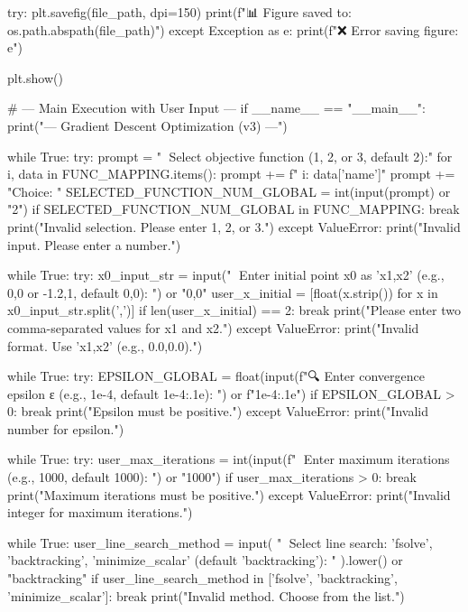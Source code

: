 \documentclass[12pt]{article} %
\begin{document}
\begin{python}
    try:
        plt.savefig(file_path, dpi=150)
        print(f"📊 Figure saved to: {os.path.abspath(file_path)}")
    except Exception as e:
        print(f"❌ Error saving figure: {e}")
    
    plt.show()

# --- Main Execution with User Input ---
if __name__ == "__main__":
    print("--- Gradient Descent Optimization (v3) ---")
    
    while True:
        try:
            prompt = "🎯 Select objective function (1, 2, or 3, default 2):\n"
            for i, data in FUNC_MAPPING.items():
                prompt += f"   {i}: {data['name']}\n"
            prompt += "Choice: "
            SELECTED_FUNCTION_NUM_GLOBAL = int(input(prompt) or "2")
            if SELECTED_FUNCTION_NUM_GLOBAL in FUNC_MAPPING:
                break
            print("Invalid selection. Please enter 1, 2, or 3.")
        except ValueError: print("Invalid input. Please enter a number.")

    while True:
        try:
            x0_input_str = input("📍 Enter initial point x0 as 'x1,x2' (e.g., 0,0 or -1.2,1, default 0,0): ") or "0,0"
            user_x_initial = [float(x.strip()) for x in x0_input_str.split(',')]
            if len(user_x_initial) == 2: break
            print("Please enter two comma-separated values for x1 and x2.")
        except ValueError: print("Invalid format. Use 'x1,x2' (e.g., 0.0,0.0).")
    
    while True:
        try:
            EPSILON_GLOBAL = float(input(f"🔍 Enter convergence epsilon ε (e.g., 1e-4, default {1e-4:.1e}): ") or f"{1e-4:.1e}")
            if EPSILON_GLOBAL > 0: break
            print("Epsilon must be positive.")
        except ValueError: print("Invalid number for epsilon.")

    while True:
        try:
            user_max_iterations = int(input(f"🔄 Enter maximum iterations (e.g., 1000, default 1000): ") or "1000")
            if user_max_iterations > 0: break
            print("Maximum iterations must be positive.")
        except ValueError: print("Invalid integer for maximum iterations.")

    while True:
        user_line_search_method = input(
            "🌊 Select line search: 'fsolve', 'backtracking', 'minimize_scalar' (default 'backtracking'): "
        ).lower() or "backtracking"
        if user_line_search_method in ['fsolve', 'backtracking', 'minimize_scalar']: break
        print("Invalid method. Choose from the list.")


\end{python}
\end{document}
